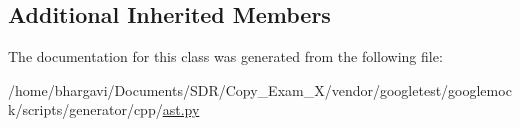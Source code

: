 \subsection*{Additional Inherited Members}


The documentation for this class was generated from the following file\+:\begin{DoxyCompactItemize}
\item 
/home/bhargavi/\+Documents/\+S\+D\+R/\+Copy\+\_\+\+Exam\+\_\+X/vendor/googletest/googlemock/scripts/generator/cpp/\hyperlink{ast_8py}{ast.\+py}\end{DoxyCompactItemize}
